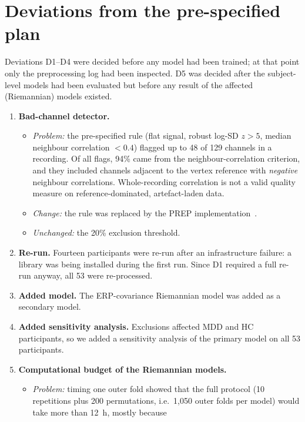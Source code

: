 \section{Deviations from the pre-specified plan}\label{app:deviations}
Deviations D1--D4 were decided before any model had been trained; at that point only the preprocessing log had been
inspected. D5 was decided after the subject-level models had been evaluated but before any result of the affected
(Riemannian) models existed.

\begin{enumerate}
  \item[D1] \textbf{Bad-channel detector.}
        \begin{itemize}
          \item \emph{Problem:} the pre-specified rule (flat signal, robust log-SD $z>5$, median neighbour correlation
                $<0.4$) flagged up to 48 of 129 channels in a recording. Of all flags, 94\% came from the
                neighbour-correlation criterion, and they included channels adjacent to the vertex reference with
                \emph{negative} neighbour correlations. Whole-recording correlation is not a valid quality measure on
                reference-dominated, artefact-laden data.
          \item \emph{Change:} the rule was replaced by the PREP implementation~\cite{bigdely2015prep}.
          \item \emph{Unchanged:} the 20\% exclusion threshold.
        \end{itemize}
  \item[D2] \textbf{Re-run.} Fourteen participants were re-run after an infrastructure failure: a library was being
        installed during the first run. Since D1 required a full re-run anyway, all 53 were re-processed.
  \item[D3] \textbf{Added model.} The ERP-covariance Riemannian model was added as a secondary model.
  \item[D4] \textbf{Added sensitivity analysis.} Exclusions affected \NExcludedMDD{} MDD and \NExcludedHC{} HC
        participants, so we added a sensitivity analysis of the primary model on all 53 participants.
  \item[D5] \textbf{Computational budget of the Riemannian models.}
        \begin{itemize}
          \item \emph{Problem:} timing one outer fold showed that the full protocol (10 repetitions plus 200
                permutations, i.e.\ 1{,}050 outer folds per model) would take more than 12~h, mostly because

\end{itemize}
\end{enumerate}
